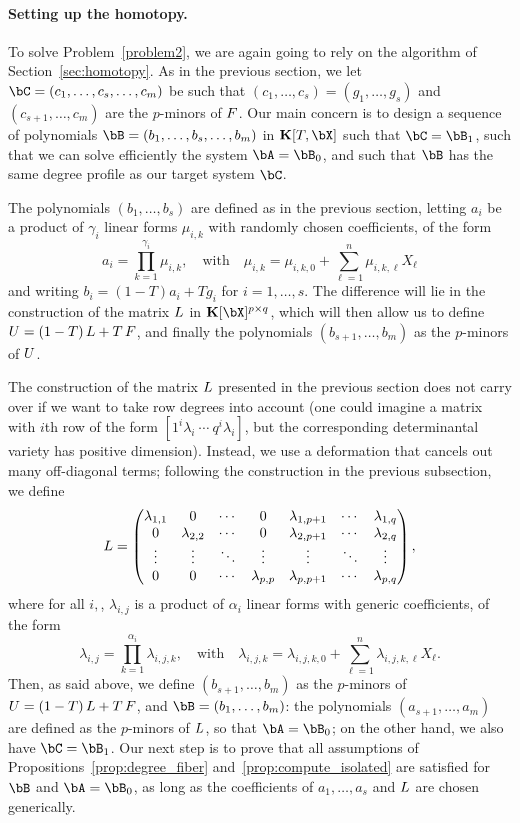 \documentclass[12pt]{article}
\begin{document}
\paragraph{Setting up the homotopy.}
To solve Problem~\ref{problem2}, we are again going to rely on the
algorithm of Section~\ref{sec:homotopy}. As in the previous section,
we let $\bC=(c_1,\dots,c_s,\dots,c_m)$ be such that
$(c_1,\dots,c_s)=(g_1,\dots,g_s)$ and $(c_{s+1},\dots,c_m)$ are the
$p$-minors of ${F}$. Our main concern is to design a sequence of
polynomials $\bB=(b_1,\dots,b_s,\dots,b_m)$ in $\KK[T,\bX]$ such that
$\bC=\bB_1$, such that we can solve efficiently the system
$\bA=\bB_0$, and such that $\bB$ has the same degree profile as our target system
$\bC$.

The polynomials $(b_1,\dots,b_s)$ are defined as in the previous
section, letting $a_i$ be a product of $\gamma_i$ linear forms
$\mu_{i,k}$ with randomly chosen coefficients, of the form
$$a_i=\prod_{k=1}^{\gamma_i} \mu_{i,k},\quad\text{with}\quad
\mu_{i,k}=\mu_{i,k,0} + \sum_{\ell=1}^n \mu_{i,k,\ell}X_\ell$$ 
and writing $b_i=(1-T)a_i + T g_i$ for $i=1,\dots,s$. The
difference will lie in the construction of the matrix ${L}$ in
$\KK[\bX]^{p\times q}$, which will then allow us to define
${U}=(1-T)\,{L} + T\, {F}$, and finally the polynomials
$(b_{s+1},\dots,b_m)$ as the $p$-minors of ${U}$.

The construction of the matrix ${L}$ presented in the previous section
does not carry over if we want to take row degrees into account (one
could imagine a matrix with $i$th row of the form $[1^i
  \lambda_i~\cdots~q^i \lambda_i]$, but the corresponding determinantal
variety has positive dimension). Instead, we use a deformation that
cancels out many off-diagonal terms; following the 
construction in the previous subsection, we define
\begin{align}\label{eqdef:startrow}
{L} = \left( \begin{matrix}
\lambda_{1,1} & 0 & \cdots & 0 & \lambda_{1,p+1} & \cdots & \lambda_{1, q}\\
0 & \lambda_{2,2} & \cdots & 0 & \lambda_{2,p+1} & \cdots & \lambda_{2, q}\\
\vdots & \vdots & \ddots & \vdots & \vdots & \ddots & \vdots\\
0 & 0 & \cdots & \lambda_{p,p} & \lambda_{p,p+1} & \cdots & \lambda_{p, q}
\end{matrix} \right), 
\end{align} 
where for all $i,$, $\lambda_{i,j}$ is a product of $\alpha_i$ linear forms with generic
coefficients, of the form
$$\lambda_{i,j}= \prod_{k=1}^{\alpha_i}\lambda_{i,j,k},
\quad\text{with}\quad
\lambda_{i,j,k} =\lambda_{i,j,k,0} + \sum_{\ell=1}^n \lambda_{i,j,k,\ell}X_\ell.
$$ Then, as said above, we define $(b_{s+1},\dots,b_m)$ as the
$p$-minors of ${U}=(1-T)\,{L} + T\, {F}$, and $\bB=(b_1,\dots,b_m)$:
the polynomials $(a_{s+1},\dots,a_m)$ are defined as the $p$-minors of
${L}$, so that $\bA=\bB_0$; on the other hand, we also have
$\bC=\bB_1$.  Our next step is to prove that all assumptions of
Propositions~\ref{prop:degree_fiber} and~\ref{prop:compute_isolated}
are satisfied for $\bB$ and $\bA=\bB_0$, as long as the coefficients 
of $a_1,\dots,a_s$ and ${L}$ are chosen generically.
\end{document}
